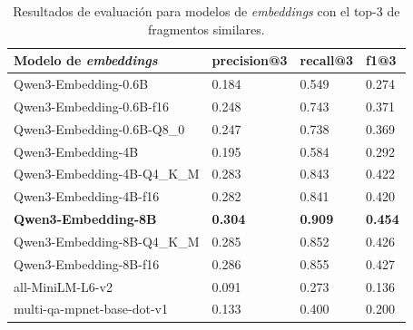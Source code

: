 \begin{table}[!ht]
    \centering
    \begin{tabular}{|l|l|l|l|}
        \hline
        Modelo de \textit{embeddings} & precision@3    & recall@3       & f1@3           \\ \hline
        Qwen3-Embedding-0.6B          & 0.184          & 0.549          & 0.274          \\ \hline
        Qwen3-Embedding-0.6B-f16      & 0.248          & 0.743          & 0.371          \\ \hline
        Qwen3-Embedding-0.6B-Q8\_0    & 0.247          & 0.738          & 0.369          \\ \hline
        Qwen3-Embedding-4B            & 0.195          & 0.584          & 0.292          \\ \hline
        Qwen3-Embedding-4B-Q4\_K\_M   & 0.283          & 0.843          & 0.422          \\ \hline
        Qwen3-Embedding-4B-f16        & 0.282          & 0.841          & 0.420          \\ \hline
        \textbf{Qwen3-Embedding-8B}   & \textbf{0.304} & \textbf{0.909} & \textbf{0.454} \\ \hline
        Qwen3-Embedding-8B-Q4\_K\_M   & 0.285          & 0.852          & 0.426          \\ \hline
        Qwen3-Embedding-8B-f16        & 0.286          & 0.855          & 0.427          \\ \hline
        all-MiniLM-L6-v2              & 0.091          & 0.273          & 0.136          \\ \hline
        multi-qa-mpnet-base-dot-v1    & 0.133          & 0.400          & 0.200          \\ \hline
    \end{tabular}
    \caption{Resultados de evaluación para modelos de \textit{embeddings} con el top-3 de fragmentos similares.}
    \label{tab:metrics_embedding_top_3}
\end{table}

